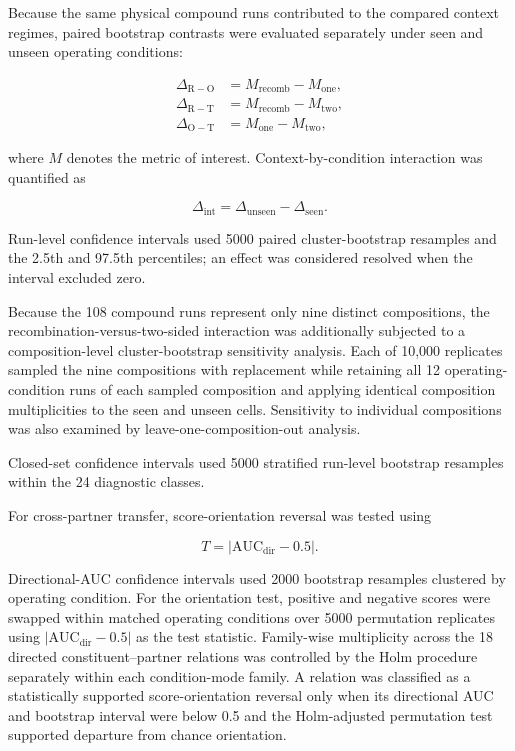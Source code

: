 \documentclass{ieeeaccess}
\begin{document}
Because the same physical compound runs contributed to the compared context
regimes, paired bootstrap contrasts were evaluated separately under seen and
unseen operating conditions:

\begin{align}
\Delta_{\mathrm{R-O}} &= M_{\mathrm{recomb}}-M_{\mathrm{one}},\\
\Delta_{\mathrm{R-T}} &= M_{\mathrm{recomb}}-M_{\mathrm{two}},\\
\Delta_{\mathrm{O-T}} &= M_{\mathrm{one}}-M_{\mathrm{two}},
\end{align}

where $M$ denotes the metric of interest. Context-by-condition interaction was
quantified as

\begin{equation}
\Delta_{\mathrm{int}}
=
\Delta_{\mathrm{unseen}}
-
\Delta_{\mathrm{seen}}.
\end{equation}

Run-level confidence intervals used 5000 paired cluster-bootstrap resamples
and the 2.5th and 97.5th percentiles; an effect was considered resolved when
the interval excluded zero.

Because the 108 compound runs represent only nine distinct compositions, the
recombination-versus-two-sided interaction was additionally subjected to a
composition-level cluster-bootstrap sensitivity analysis. Each of 10,000
replicates sampled the nine compositions with replacement while retaining all
12 operating-condition runs of each sampled composition and applying identical
composition multiplicities to the seen and unseen cells. Sensitivity to
individual compositions was also examined by leave-one-composition-out
analysis.

Closed-set confidence intervals used 5000 stratified run-level bootstrap
resamples within the 24 diagnostic classes.

For cross-partner transfer, score-orientation reversal was tested using

\begin{equation}
T=
\left|
\mathrm{AUC}_{\mathrm{dir}}-0.5
\right|.
\label{eq:polarity_statistic}
\end{equation}

Directional-AUC confidence intervals used 2000 bootstrap resamples clustered
by operating condition. For the orientation test, positive and negative scores
were swapped within matched operating conditions over 5000 permutation
replicates using
$|\mathrm{AUC}_{\mathrm{dir}}-0.5|$ as the test statistic.
Family-wise multiplicity across the 18 directed constituent--partner
relations was controlled by the Holm procedure separately within each
condition-mode family. A
relation was classified as a statistically supported score-orientation
reversal only when its directional AUC and bootstrap interval were below
0.5 and the Holm-adjusted permutation test supported departure from chance
orientation.
\end{document}
